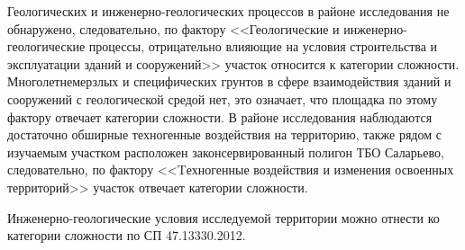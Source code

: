 Геологических и инженерно-геологических процессов 
в районе исследования не обнаружено, следовательно, по фактору 
<<Геологические и инженерно-геологические процессы, отрицательно влияющие на условия строительства и эксплуатации 
зданий и сооружений>> участок относится к  категории сложности. 
Многолетнемерзлых и специфических грунтов в сфере взаимодействия зданий и сооружений с геологической средой
нет, это означает, что площадка по этому фактору отвечает 
 категории сложности. 
В районе исследования наблюдаются достаточно обширные техногенные воздействия на территорию, 
также рядом с изучаемым участком расположен законсервированный 
полигон ТБО Саларьево, следовательно, по фактору 
<<Tехногенные воздействия и изменения освоенных территорий>> участок 
отвечает  категории сложности.

Инженерно-геологические условия исследуемой территории можно отнести
ко  категории сложности по СП 47.13330.2012.